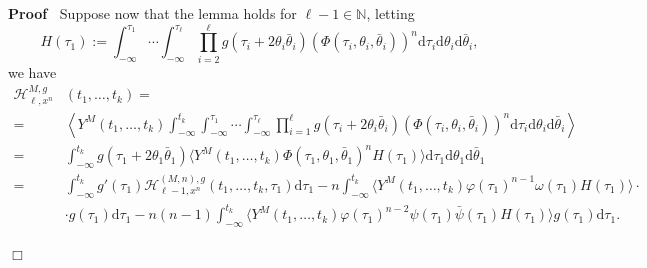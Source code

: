 \documentclass[a4paper,10pt]{article}
\newcommand{\assign}{:=}
\newcommand{\mathd}{\mathrm{d}}
\newenvironment{proof}{\noindent\textbf{Proof\ }}{\hspace*{\fill}$\Box$\medskip}
\begin{document}
\begin{proof}
  Suppose now that the lemma holds for $\ell - 1 \in \mathbb{N}$, letting
  \[ H (\tau_1) \assign \int_{- \infty}^{\tau_1} \cdots \int_{-
     \infty}^{\tau_{\ell}} \prod_{i = 2}^{\ell} g (\tau_i + 2 \theta_i
     \bar{\theta}_i) (\Phi (\tau_i, \theta_i, \bar{\theta}_i))^n \mathd \tau_i
     \mathd \theta_i \mathd \bar{\theta}_i, \]
  we have
  \begin{align*}
\mathcal{H}^{M, g}_{\ell, x^n}& (t_1, \ldots, t_k) =\\
=&\left\langle Y^M
     (t_1, \ldots, t_k)  \int_{- \infty}^{t_k} \int_{- \infty}^{\tau_1} \cdots
     \int_{- \infty}^{\tau_{\ell}} \prod_{i = 1}^{\ell} g \left( \tau_i + 2
     \theta_i \bar{\theta}_i \right) (\Phi (\tau_i, \theta_i,
     \bar{\theta}_i))^n \mathd \tau_i \mathd \theta_i \mathd \bar{\theta}_i
     \right\rangle \\
 = &\int_{- \infty}^{t_k} g (\tau_1 + 2 \theta_1 \bar{\theta}_1) \langle
     Y^M (t_1, \ldots, t_k) \Phi (\tau_1, \theta_1, \bar{\theta}_1)^n H
     (\tau_1) \rangle \mathd \tau_1 \mathd \theta_1 \mathd \bar{\theta}_1 \\
  = &\int_{- \infty}^{t_k} g' (\tau_1) \mathcal{H}^{(M, n), g}_{\ell - 1,
     x^n} (t_1, \ldots, t_k, \tau_1) \mathd \tau_1 -n \int_{- \infty}^{t_k}
     \langle Y^M (t_1, \ldots, t_k) \varphi (\tau_1)^{n - 1} \omega (\tau_1) H
     (\tau_1) \rangle \cdot \\
   & \cdot g (\tau_1) \mathd \tau_1- n
     (n - 1) \int_{- \infty}^{t_k} \langle Y^M (t_1, \ldots, t_k) \varphi
     (\tau_1)^{n - 2} \psi (\tau_1) \bar{\psi} (\tau_1) H (\tau_1) \rangle g (\tau_1) \mathd \tau_1 .
\end{align*}

\end{proof}
\end{document}
